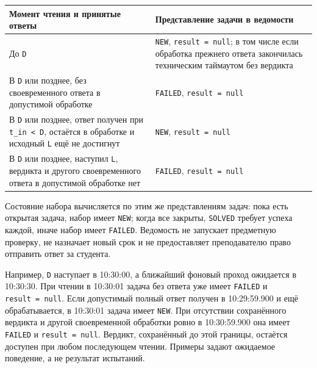 \documentclass[12pt,a4paper]{article}
\newcounter{none} %
\begin{document}
{\def\LTcaptype{none} %
\begin{longtable}[]{@{}
  >{\raggedright\arraybackslash}p{}
  >{\raggedright\arraybackslash}p{}@{}}
\toprule\noalign{}
\begin{minipage}[b]{\linewidth}\raggedright
Момент чтения и принятые ответы
\end{minipage} & \begin{minipage}[b]{\linewidth}\raggedright
Представление задачи в ведомости
\end{minipage} \\
\midrule\noalign{}
\endhead
\bottomrule\noalign{}
\endlastfoot
До \texttt{D} & \texttt{NEW}, \texttt{result\ =\ null}; в том числе если обработка прежнего ответа закончилась техническим таймаутом без вердикта \\
В \texttt{D} или позднее, без своевременного ответа в допустимой обработке & \texttt{FAILED}, \texttt{result\ =\ null} \\
В \texttt{D} или позднее, ответ получен при \texttt{t\_in\ \textless{}\ D}, остаётся в обработке и исходный \texttt{L} ещё не достигнут & \texttt{NEW}, \texttt{result\ =\ null} \\
В \texttt{D} или позднее, наступил \texttt{L}, вердикта и другого своевременного ответа в допустимой обработке нет & \texttt{FAILED}, \texttt{result\ =\ null} \\
\end{longtable}
}

Состояние набора вычисляется по этим же представлениям задач: пока есть открытая задача, набор имеет \texttt{NEW}; когда все закрыты, \texttt{SOLVED} требует успеха каждой, иначе набор имеет \texttt{FAILED}. Ведомость не запускает предметную проверку, не назначает новый срок и не предоставляет преподавателю право отправить ответ за студента.

Например, \texttt{D} наступает в 10:30:00, а ближайший фоновый проход ожидается в 10:30:30. При чтении в 10:30:01 задача без ответа уже имеет \texttt{FAILED} и \texttt{result\ =\ null}. Если допустимый полный ответ получен в 10:29:59.900 и ещё обрабатывается, в 10:30:01 задача имеет \texttt{NEW}. При отсутствии сохранённого вердикта и другой своевременной обработки ровно в 10:30:59.900 она имеет \texttt{FAILED} и \texttt{result\ =\ null}. Вердикт, сохранённый до этой границы, остаётся доступен при любом последующем чтении. Примеры задают ожидаемое поведение, а не результат испытаний.
\end{document}
